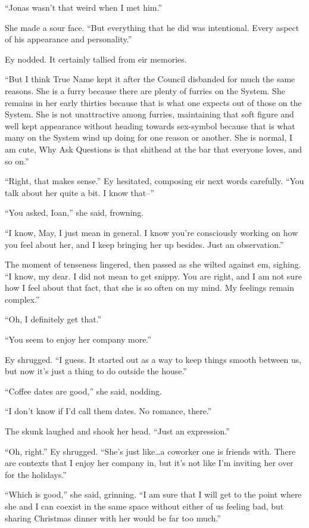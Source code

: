 ``Jonas wasn't that weird when I met him.''

She made a sour face. ``But everything that he did was intentional. Every aspect of his appearance and personality.''

Ey nodded. It certainly tallied from eir memories.

``But I think True Name kept it after the Council disbanded for much the same reasons. She is a furry because there are plenty of furries on the System. She remains in her early thirties because that is what one expects out of those on the System. She is not unattractive among furries, maintaining that soft figure and well kept appearance without heading towards sex-symbol because that is what many on the System wind up doing for one reason or another. She is normal, I am cute, Why Ask Questions is that shithead at the bar that everyone loves, and so on.''

``Right, that makes sense.'' Ey hesitated, composing eir next words carefully. ``You talk about her quite a bit. I know that--''

``You asked, Ioan,'' she said, frowning.

``I know, May, I just mean in general. I know you're consciously working on how you feel about her, and I keep bringing her up besides. Just an observation.''

The moment of tenseness lingered, then passed as she wilted against em, sighing. ``I know, my dear. I did not mean to get snippy. You are right, and I am not sure how I feel about that fact, that she is so often on my mind. My feelings remain complex.''

``Oh, I definitely get that.''

``You seem to enjoy her company more.''

Ey shrugged. ``I guess. It started out as a way to keep things smooth between us, but now it's just a thing to do outside the house.''

``Coffee dates are good,'' she said, nodding.

``I don't know if I'd call them dates. No romance, there.''

The skunk laughed and shook her head. ``Just an expression.''

``Oh, right.'' Ey shrugged. ``She's just like\ldots a coworker one is friends with. There are contexts that I enjoy her company in, but it's not like I'm inviting her over for the holidays.''

``Which is good,'' she said, grinning. ``I am sure that I will get to the point where she and I can coexist in the same space without either of us feeling bad, but sharing Christmas dinner with her would be far too much.''


